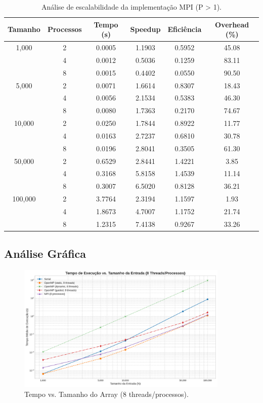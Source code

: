 \documentclass[12pt, a4paper]{article}
\begin{document}
\begin{table}[H]
\centering
\caption{Análise de escalabilidade da implementação MPI (P > 1).}
\label{tab:mpi-all-sizes-filtered}
\begin{tabular}{cccccc}
\toprule
\textbf{Tamanho} & \textbf{Processos} & \textbf{Tempo (s)} & \textbf{Speedup} & \textbf{Eficiência} & \textbf{Overhead (\%)} \\
\midrule
1,000 & 2 & 0.0005 & 1.1903 & 0.5952 & 45.08 \\
 & 4 & 0.0012 & 0.5036 & 0.1259 & 83.11 \\
 & 8 & 0.0015 & 0.4402 & 0.0550 & 90.50 \\
\midrule
5,000 & 2 & 0.0071 & 1.6614 & 0.8307 & 18.43 \\
 & 4 & 0.0056 & 2.1534 & 0.5383 & 46.30 \\
 & 8 & 0.0080 & 1.7363 & 0.2170 & 74.67 \\
\midrule
10,000 & 2 & 0.0250 & 1.7844 & 0.8922 & 11.77 \\
 & 4 & 0.0163 & 2.7237 & 0.6810 & 30.78 \\
 & 8 & 0.0196 & 2.8041 & 0.3505 & 61.30 \\
\midrule
50,000 & 2 & 0.6529 & 2.8441 & 1.4221 & 3.85 \\
 & 4 & 0.3168 & 5.8158 & 1.4539 & 11.14 \\
 & 8 & 0.3007 & 6.5020 & 0.8128 & 36.21 \\
\midrule
100,000 & 2 & 3.7764 & 2.3194 & 1.1597 & 1.93 \\
 & 4 & 1.8673 & 4.7007 & 1.1752 & 21.74 \\
 & 8 & 1.2315 & 7.4138 & 0.9267 & 33.26 \\
\bottomrule
\end{tabular}
\end{table}

\subsection{Análise Gráfica}

\begin{figure}[H]
    \centering
    \includegraphics[width=0.9\textwidth]{../graficos/tempo_vs_tamanho_8_threads.png}
    \caption{Tempo vs. Tamanho do Array (8 threads/processos).}
    \label{fig:tempo_vs_tamanho}
\end{figure}
\end{document}
